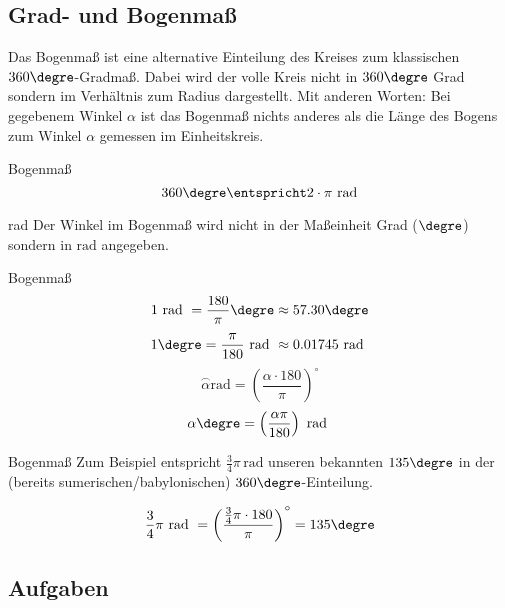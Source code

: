 
\subsection{Grad- und Bogenmaß}


Das Bogenmaß ist eine alternative Einteilung des Kreises zum
klassischen $360\degre$-Gradmaß. Dabei wird der volle Kreis nicht in
$360\degre$ Grad sondern im Verhältnis zum Radius dargestellt. Mit
anderen Worten: Bei gegebenem Winkel $\alpha$ ist das Bogenmaß nichts
anderes als die Länge des Bogens zum Winkel $\alpha$ gemessen im Einheitskreis.


\begin{definition}{Bogenmaß}{}
$$360\degre \entspricht 2\cdot\pi \textrm{\,\,rad}$$
\end{definition}

\begin{bemerkung}{rad}{}
Der Winkel im Bogenmaß wird nicht in der Maßeinheit Grad (${}\degre$)
sondern in $\textrm{rad}$ angegeben.
\end{bemerkung}

\begin{gesetz}{Bogenmaß}{}
$$1 \textrm{ rad } = \frac{180}{\pi}\degre \approx 57.30\degre$$
$$1\degre = \frac{\pi}{180} \textrm{ rad } \approx 0.01745 \textrm{ rad }$$
$$\stackrel{\frown}{\alpha} \textrm{rad} = \left(\frac{\alpha\cdot{}180}{\pi}\right)^\circ$$
$$\alpha\degre = \left(\frac{\alpha\pi}{180}\right) \textrm{ rad }$$  
\end{gesetz}

\begin{beispiel}{Bogenmaß}{}
 Zum Beispiel entspricht
$\frac{3}{4}\pi\,\textrm{rad}$ unseren bekannten $135\degre$ in der
(bereits sumerischen/babylonischen) $360\degre$-Einteilung.

 $$\frac34\pi \textrm{ rad } = \left(\frac{\frac34\pi\cdot{}180}{\pi}\right)^\circ = 135\degre$$
\end{beispiel}
\newpage



\subsection*{Aufgaben}


\newpage
